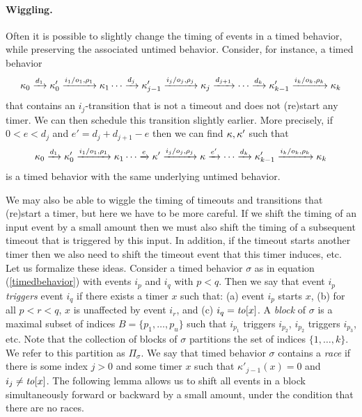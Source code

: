 \paragraph{Wiggling.}
Often it is possible to slightly change the timing of events in a timed behavior, 
while preserving the associated untimed behavior.
Consider, for instance, a timed behavior 
\[
\kappa_0 \xrightarrow{d_1} \kappa'_0 \xrightarrow{i_1/o_1, \rho_1} \kappa_1 \cdots
\xrightarrow{d_j} \kappa'_{j-1} \xrightarrow{i_j/o_j, \rho_j} \kappa_j  \xrightarrow{d_{j+1}} \cdots
\xrightarrow{d_k} \kappa'_{k-1} \xrightarrow{i_k/o_k, \rho_k} \kappa_{k}
\]
that contains an $i_j$-transition that is not a timeout and does not (re)start any timer.
We can then schedule this transition slightly earlier.
More precisely, if $0 < e < d_j$ and $e' = d_j + d_{j+1}- e $ then we can find $\kappa, \kappa'$ such that
\[
\kappa_0 \xrightarrow{d_1} \kappa'_0 \xrightarrow{i_1/o_1, \rho_1} \kappa_1 \cdots
\xrightarrow{e} \kappa' \xrightarrow{i_j/o_j, \rho_j} \kappa  \xrightarrow{e'} \cdots
\xrightarrow{d_k} \kappa'_{k-1} \xrightarrow{i_k/o_k, \rho_k} \kappa_{k}
\]
is a timed behavior with the same underlying untimed behavior.

We may also be able to wiggle the timing of timeouts and transitions that (re)start a timer,
but here we have to be more careful.
If we shift the timing of an input event by a small amount then we must also shift the timing of a subsequent timeout
that is triggered by this input.
In addition, if the timeout starts another timer then we also need to shift the timeout event that this timer induces, etc.
%
Let us formalize these ideas. Consider a timed behavior $\sigma$ as in equation (\ref{timedbehavior})
with events $i_p$ and $i_q$ with $p < q$.
Then we say that event $i_p$ \emph{triggers} event $i_q$ if there exists a timer $x$ such that:
(a) event $i_p$ starts $x$, 
(b) for all $p < r < q$, $x$ is unaffected by event $i_r$, and
(c) $i_q = \mathit{to}[x]$.
A \emph{block} of $\sigma$ is a maximal subset of indices $B = \{ p_1 ,\ldots, p_u \}$ such that $i_{p_1}$ triggers $i_{p_2}$, $i_{p_2}$ triggers $i_{p_3}$, etc.
Note that the collection of blocks of $\sigma$ partitions the set of indices $\{ 1 ,\ldots, k \}$.
We refer to this partition as $\Pi_{\sigma}$.
We say that timed behavior $\sigma$ contains a \emph{race} if there is some index $j>0$ and some timer $x$  
such that $\kappa'_{j-1}(x) = 0$ and $i_j \neq \mathit{to}[x]$.
The following lemma allows us to shift all events in a block simultaneously forward or backward by a small amount, 
under the condition that there are no races.

